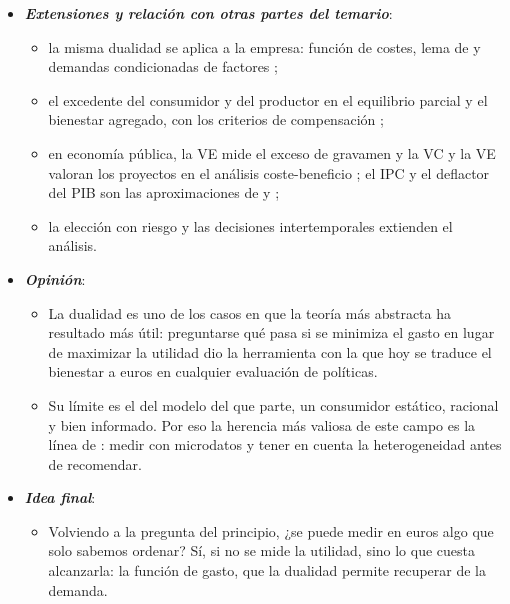\documentclass[11pt]{article}
\begin{document}
\begin{itemize}
\begin{itemize}
  \item Con ellas se calculan las elasticidades de la política fiscal, el exceso de gravamen, los beneficios de un proyecto público o el sesgo del IPC.
  \end{itemize}
\item \textbf{\emph{Extensiones y relación con otras partes del temario}}:
  \begin{itemize}
  \item la misma dualidad se aplica a la empresa: función de costes, lema de  y demandas condicionadas de factores ;
  \item el excedente del consumidor y del productor en el equilibrio parcial  y el bienestar agregado, con los criterios de compensación  ;
  \item en economía pública, la VE mide el exceso de gravamen  y la VC y la VE valoran los proyectos en el análisis coste-beneficio ; el IPC y el deflactor del PIB son las aproximaciones de  y   ;
  \item la elección con riesgo  y las decisiones intertemporales  extienden el análisis.
  \end{itemize}
\item \textbf{\emph{Opinión}}:
  \begin{itemize}
  \item La dualidad es uno de los casos en que la teoría más abstracta ha resultado más útil: preguntarse qué pasa si se minimiza el gasto en lugar de maximizar la utilidad dio la herramienta con la que hoy se traduce el bienestar a euros en cualquier evaluación de políticas.

  \item Su límite es el del modelo del que parte, un consumidor estático, racional y bien informado. Por eso la herencia más valiosa de este campo es la línea de : medir con microdatos y tener en cuenta la heterogeneidad antes de recomendar.
  \end{itemize}
\item \textbf{\emph{Idea final}}:
  \begin{itemize}
  \item Volviendo a la pregunta del principio, ¿se puede medir en euros algo que solo sabemos ordenar? Sí, si no se mide la utilidad, sino lo que cuesta alcanzarla: la función de gasto, que la dualidad permite recuperar de la demanda.


\end{itemize}
\end{itemize}
\end{document}

